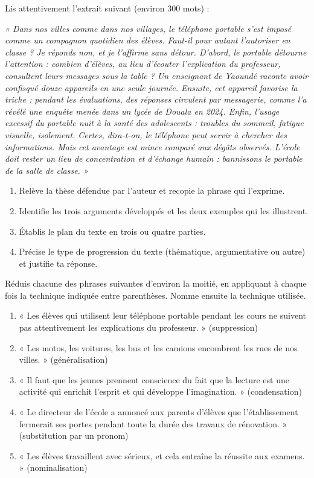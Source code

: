 \documentclass[11pt]{article}
\begin{document}
\begin{exercice}
Lis attentivement l'extrait suivant (environ 300 mots) :

\emph{« Dans nos villes comme dans nos villages, le téléphone portable s'est imposé comme un compagnon quotidien des élèves. Faut-il pour autant l'autoriser en classe ? Je réponds non, et je l'affirme sans détour. D'abord, le portable détourne l'attention : combien d'élèves, au lieu d'écouter l'explication du professeur, consultent leurs messages sous la table ? Un enseignant de Yaoundé raconte avoir confisqué douze appareils en une seule journée. Ensuite, cet appareil favorise la triche : pendant les évaluations, des réponses circulent par messagerie, comme l'a révélé une enquête menée dans un lycée de Douala en 2024. Enfin, l'usage excessif du portable nuit à la santé des adolescents : troubles du sommeil, fatigue visuelle, isolement. Certes, dira-t-on, le téléphone peut servir à chercher des informations. Mais cet avantage est mince comparé aux dégâts observés. L'école doit rester un lieu de concentration et d'échange humain : bannissons le portable de la salle de classe. »}

\begin{enumerate}
\item Relève la thèse défendue par l'auteur et recopie la phrase qui l'exprime.
\item Identifie les trois arguments développés et les deux exemples qui les illustrent.
\item Établis le plan du texte en trois ou quatre parties.
\item Précise le type de progression du texte (thématique, argumentative ou autre) et justifie ta réponse.
\end{enumerate}
\end{exercice}

\begin{exercice}
Réduis chacune des phrases suivantes d'environ la moitié, en appliquant à chaque fois la technique indiquée entre parenthèses. Nomme ensuite la technique utilisée.
\begin{enumerate}
\item « Les élèves qui utilisent leur téléphone portable pendant les cours ne suivent pas attentivement les explications du professeur. » (suppression)
\item « Les motos, les voitures, les bus et les camions encombrent les rues de nos villes. » (généralisation)
\item « Il faut que les jeunes prennent conscience du fait que la lecture est une activité qui enrichit l'esprit et qui développe l'imagination. » (condensation)
\item « Le directeur de l'école a annoncé aux parents d'élèves que l'établissement fermerait ses portes pendant toute la durée des travaux de rénovation. » (substitution par un pronom)
\item « Les élèves travaillent avec sérieux, et cela entraîne la réussite aux examens. » (nominalisation)
\end{enumerate}
\end{exercice}
\end{document}
